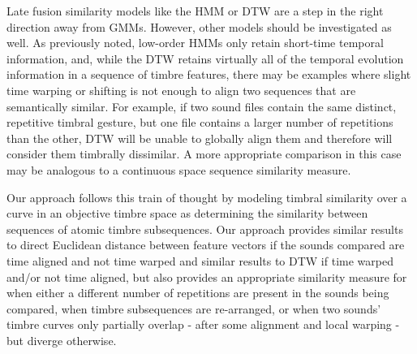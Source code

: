 \documentclass[a4paper,12pt]{report} 	%
\numberwithin{figure}{chapter}
\numberwithin{table}{chapter}
\numberwithin{equation}{chapter}
\begin{document}
\begin{flushleft}
Late fusion similarity models like the HMM or DTW are a step in the right direction away from GMMs. However, other models should be investigated as well. As previously noted, low-order HMMs only retain short-time temporal information, and, while the DTW retains virtually all of the temporal evolution information in a sequence of timbre features, there may be examples where slight time warping or shifting is not enough to align two sequences that are semantically similar. For example, if two sound files contain the same distinct, repetitive timbral gesture, but one file contains a larger number of repetitions than the other, DTW will be unable to globally align them and therefore will consider them timbrally dissimilar. A more appropriate comparison in this case may be analogous to a continuous space sequence similarity measure.

Our approach follows this train of thought by modeling timbral similarity over a curve in an objective timbre space as determining the similarity between sequences of atomic timbre subsequences. Our approach provides similar results to direct Euclidean distance between feature vectors if the sounds compared are time aligned and not time warped and similar results to DTW if time warped and/or not time aligned, but also provides an appropriate similarity measure for when either a different number of repetitions are present in the sounds being compared, when timbre subsequences are re-arranged, or when two sounds' timbre curves only partially overlap - after some alignment and local warping - but diverge otherwise.


\end{flushleft}
\end{document}
